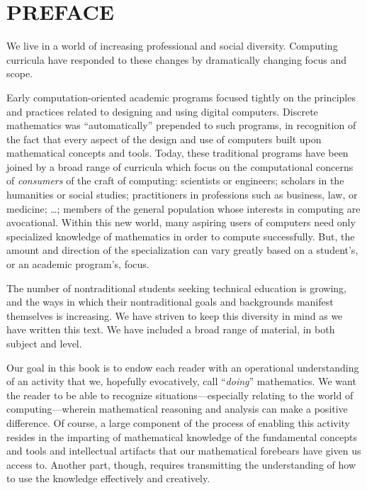 
\chapter*{PREFACE}

We live in a world of increasing professional and social diversity.
Computing curricula have responded to these changes by dramatically
changing focus and scope.

Early computation-oriented academic programs focused tightly on the
principles and practices related to designing and using digital
computers.  Discrete mathematics was ``automatically'' prepended to
such programs, in recognition of the fact that every aspect of the
design and use of computers built upon mathematical concepts and
tools.  Today, these traditional programs have been joined by a broad
range of curricula which focus on the computational concerns of {\em
  consumers} of the craft of computing: scientists or engineers;
scholars in the humanities or social studies; practitioners in
professions such as business, law, or medicine; \ldots; members of the
general population whose interests in computing are avocational.
Within this new world, many aspiring users of computers need only
specialized knowledge of mathematics in order to compute successfully.
But, the amount and direction of the specialization can vary greatly
based on a student's, or an academic program's, focus.

\medskip

The number of nontraditional students seeking technical education is
growing, and the ways in which their nontraditional goals and
backgrounds manifest themselves is increasing.  We have striven to
keep this diversity in mind as we have written this text.  We have
included a broad range of material, in both subject and level.

\bigskip

Our goal in this book is to endow each reader with an operational
understanding of an activity that we, hopefully evocatively, call
``{\em doing}'' mathematics.  We want the reader to be able to
recognize situations---especially relating to the world of
computing---wherein mathematical reasoning and analysis can make a
positive difference.  Of course, a large component of the process of
enabling this activity resides in the imparting of mathematical
knowledge of the fundamental concepts and tools and intellectual
artifacts that our mathematical forebears have given us access to.
Another part, though, requires transmitting the understanding of how
to use the knowledge effectively and creatively.

